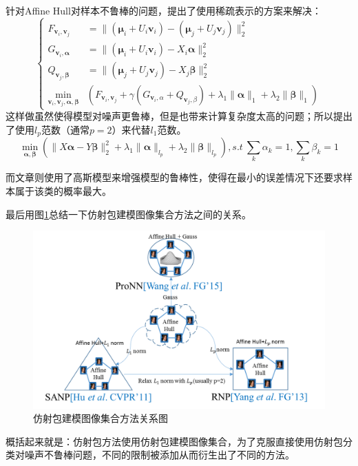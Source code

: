 针对Affine Hull对样本不鲁棒的问题，\cite{Affinehull_SANP}提出了使用稀疏表示的方案来解决：
\begin{equation}
\left\{
\begin{split}
\label{affinehull_SANP}
F_{\bm{v}_i,\bm{v}_j}&=\|(\bm{\mu}_i+U_i \bm{v}_i)-(\bm{\mu}_j+U_j \bm{v}_j)\|_{2}^{2}\\
G_{\bm{v}_i,\bm{\alpha}}&=\|(\bm{\mu}_i+U_i \bm{v}_i)-X_i \bm{\alpha}\|_{2}^{2}\\
Q_{\bm{v}_j,\bm{\beta}}&=\|(\bm{\mu}_j+U_j \bm{v}_j)-X_j \bm{\beta}\|_{2}^{2}\\
\min_{\bm{v}_i,\bm{v}_j,\bm{\alpha},\bm{\beta}}&(F_{\bm{v}_i,\bm{v}_j}+\gamma(G_{\bm{v}_i,\alpha}+Q_{\bm{v}_j,\beta})+\lambda_1 \|\bm{\alpha}\|_1+\lambda_2 \|\bm{\beta}\|_1)
\end{split}
\right.
\end{equation}
这样做虽然使得模型对噪声更鲁棒，但是也带来计算复杂度太高的问题；所以\cite{Affinehull_RNP}提出了使用$l_p$范数（通常$p=2$）来代替$l_1$范数。
\begin{equation}
\label{affinehull_RNP}
\min_{\bm{\alpha},\bm{\beta}}\left(\|X\bm{\alpha}-Y\bm{\beta}\|_2^2+\lambda_1 \|\bm{\alpha}\|_{l_p}+\lambda_2 \|\bm{\beta}\|_{l_p}\right),s.t~\sum_{k}\alpha_k =1,\sum_k\beta_k =1
\end{equation}

而文章\cite{Affinehull_ProNN}则使用了高斯模型来增强模型的鲁棒性，使得在最小的误差情况下还要求样本属于该类的概率最大。

最后用图\ref{fig:Affinehull_relation}总结一下仿射包建模图像集合方法之间的关系。
\begin{figure}[h]
	\centering
	\includegraphics[width=0.7\linewidth]{source/Affinehull_relation.png}
	\caption{仿射包建模图像集合方法关系图}
	\label{fig:Affinehull_relation}
\end{figure}

概括起来就是：仿射包方法使用仿射包建模图像集合，为了克服直接使用仿射包分类对噪声不鲁棒问题，不同的限制被添加从而衍生出了不同的方法。
